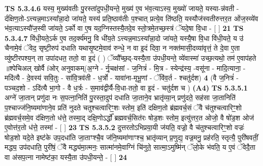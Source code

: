 \documentclass[17pt]{extarticle}
\begin{document}
                  \newline
                                \textbf{ TS 5.3.4.6} \newline
                  यस्य॒ मुख्य॑वतीः पु॒रस्ता॑दुपधी॒यन्ते॒ मुख्य॑ ए॒व भ॑व॒त्याऽस्य॒ मुख्यो॑ जायते॒ यस्या-न्न॑वती - र्दक्षिण॒तो-ऽत्त्यन्न॒माऽस्या᳚न्ना॒दो जा॑यते॒ यस्य॑ प्रति॒ष्ठाव॑तीः प॒श्चात् प्रत्ये॒व ति॑ष्ठति॒ यस्यौज॑स्वतीरुत्तर॒त ओ॑ज॒स्व्ये॑व भ॑व॒त्याऽस्यौ॑ज॒स्वी जा॑यते॒ ऽर्को वा ए॒ष यद॒ग्निस्तस्यै॒तदे॒व स्तो॒त्रमे॒तच्छ॒स्त्रं ॅयदे॒षा वि॒धा - [  ] \textbf{  21} \newline
                  \newline
                                \textbf{ TS 5.3.4.7} \newline
                  वि॑धी॒यते॒ऽर्क ए॒व तद॒र्क्य॑मनु॒ वि धी॑य॒ते ऽत्त्यन्न॒माऽस्या᳚न्ना॒दो जा॑यते॒ यस्यै॒षा वि॒धा वि॑धी॒यते॒ य उ॑ चैनामे॒वं ॅवेद॒ सृष्टी॒रुप॑ दधाति यथासृ॒ष्टमे॒वाव॑ रुन्धे॒ न वा इ॒दं दिवा॒ न नक्त॑मासी॒दव्या॑वृत्तं॒ ते दे॒वा ए॒ता व्यु॑ष्टीरपश्य॒न् ता उपा॑दधत॒ ततो॒ वा इ॒दं ( ) ॅव्यौ᳚च्छ॒द्-यस्यै॒ता उ॑पधी॒यन्ते॒ व्ये॑वास्मा॑ उच्छ॒त्यथो॒ तम॑ ए॒वाप॑हते ॥श्पेचिअल् खोर्वै fओर् अनुवाकम्(अ॒ग्ने - र्नृ॒चक्ष॑सां - ज॒नित्रं॑ - मि॒त्र - स्येन्द्र॑स्य॒ -वसू॑ना - मादि॒त्याना॒ - मदि॑त्यै - दे॒वस्य॑ सवि॒तुः - सा॑वि॒त्रव॑ती - ध॒र्त्रो - यावा॑ना-मृभू॒णां - ॅवि॑व॒र्त - श्चतु॑र्दश) \textbf{  4} \newline
                  \newline
                      (वै ज॒नित्रं॑ - पञ्चद॒शो - ऽदि॑त्यै भा॒गो - वै ध॒र्त्रः - स॒माव॑द्वीर्यै-वि॒धा-ततो॒ वा इ॒दं - चतु॑र्दश च )  \textbf{(A4)} \newline \newline
                                        \textbf{ TS 5.3.5.1} \newline
                  अग्ने॑ जा॒तान् प्रणु॑दा नः स॒पत्ना॒निति॑ पु॒रस्ता॒दुप॑ दधाति जा॒ताने॒व भ्रातृ॑व्या॒न् प्रणु॑दते॒ सह॑सा जा॒तानिति॑ प॒श्चाज्ज॑नि॒ष्यमा॑णाने॒व प्रति॑ नुदते चतुश्चत्वारिꣳ॒॒शः स्तोम॒ इति॑ दक्षिण॒तो ब्र॑ह्मवर्च॒सं ॅवै च॑तुश्चत्वारिꣳ॒॒शो ब्र॑ह्मवर्च॒समे॒व द॑क्षिण॒तो ध॑त्ते॒ तस्मा॒द् दक्षि॒णोऽर्द्धो᳚ ब्रह्मवर्च॒सित॑रः षोड॒शः स्तोम॒ इत्यु॑त्तर॒त ओजो॒ वै षो॑ड॒श ओज॑ ए॒वोत्त॑र॒तो ध॑त्ते॒ तस्मा॑ - [  ] \textbf{  23} \newline
                  \newline
                                \textbf{ TS 5.3.5.2} \newline
                  दुत्तरतोऽभिप्रया॒यी ज॑यति॒ वज्रो॒ वै च॑तुश्चत्वारिꣳ॒॒शो वज्रः॑ षोड॒शो यदे॒ते इष्ट॑के उप॒दधा॑ति जा॒ताꣳश्चै॒व ज॑नि॒ष्यमा॑णाꣳश्च॒ भ्रातृ॑व्यान् प्र॒णुद्य॒ वज्र॒मनु॒ प्रह॑रति॒ स्तृत्यै॒ पुरी॑षवतीं॒ मद्ध्य॒ उप॑दधाति॒ पुरी॑षं॒ ॅवै मद्ध्य॑मा॒त्मनः॒ सात्मा॑नमे॒वाग्निं चि॑नुते॒ सात्मा॒ऽमुष्मि॑न् ॅलो॒के भ॑वति॒ य ए॒वं ॅवेदै॒ता वा अ॑सप॒त्ना नामेष्ट॑का॒ यस्यै॒ता उ॑पधी॒यन्ते॒ - [  ] \textbf{  24} \newline
\end{document}
